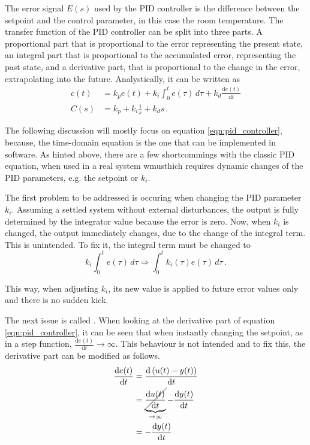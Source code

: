 The error signal $E(s)$ used by the PID controller is the difference between the setpoint and the control parameter, in this case the room temperature. The transfer function of the PID controller can be split into three parts. A proportional part that is proportional to the error representing the present state, an integral part that is proportional to the accumulated error, representing the past state, and a derivative part, that is proportional to the change in the error, extrapolating into the future. Analystically, it can be written as
\begin{align}
    c(t) &= k_p e(t) + k_i \int_0^t e(\tau) \,d\tau + k_d \frac{\mathrm{d}e(t)}{\mathrm{d}t} \label{eqn:pid_controller}\\
    C(s) &= k_p + k_i \frac{1}{s} + k_d s \,. \label{eqn:pid_controller_laplace}
\end{align}

The following discussion will mostly focus on equation \ref{eqn:pid_controller}, because, the time-domain equation is the one that can be implemented in software. As hinted above, there are a few shortcommings with the classic PID equation, when used in a real system wmusthich requires dynamic changes of the PID parameters, e.g. the setpoint or $k_i$.

The first problem to be addressed is occuring when changing the PID parameter $k_i$. Assuming a settled system without external disturbances, the output is fully determined by the integrator value because the error is zero. Now, when $k_i$ is changed, the output immediately changes, due to the change of the integral term. This is unintended. To fix it, the integral term must be changed to
\begin{equation}
    k_i \int_0^t e(\tau) \,d\tau \Rightarrow \int_0^t k_i(\tau) e(\tau) \,d\tau \,.
\end{equation}

This way, when adjusting $k_i$, its new value is applied to future error values only and there is no sudden kick.

The next issue is called . When looking at the derivative part of equation \ref{eqn:pid_controller}, it can be seen that when instantly changing the setpoint, as in a step function, $\frac{\mathrm{d}e(t)}{\mathrm{d}t} \to \infty$. This behaviour is not intended and to fix this, the derivative part can be modified as follows.
\begin{align}
    \frac{\mathrm{d}e(t)}{\mathrm{d}t} &= \frac{\mathrm{d}\left(u(t) - y(t)\right)}{\mathrm{d}t} \nonumber\\
    &= \underbrace{\cancel{\frac{\mathrm{d}u(t)}{\mathrm{d}t}}}_{\to \infty} - \frac{\mathrm{d}y(t)}{\mathrm{d}t} \nonumber\\
    &=- \frac{\mathrm{d}y(t)}{\mathrm{d}t}
\end{align}

